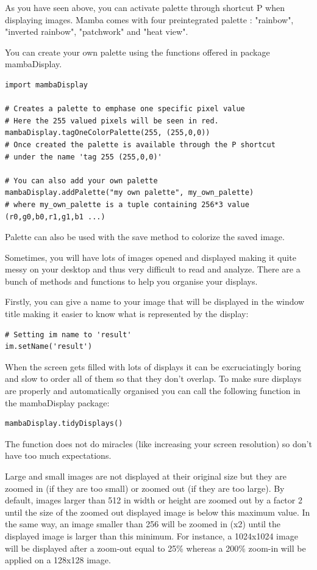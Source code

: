\documentclass[a4paper,10pt,oneside]{article}
\begin{document}
As you have seen above, you can activate palette through shortcut P when displaying
images. Mamba comes with four preintegrated palette : "rainbow", "inverted rainbow",
"patchwork" and "heat view".

You can create your own palette using the functions offered in package
mambaDisplay.

\lstset{language=Python}
\begin{lstlisting}
import mambaDisplay

# Creates a palette to emphase one specific pixel value
# Here the 255 valued pixels will be seen in red.
mambaDisplay.tagOneColorPalette(255, (255,0,0))
# Once created the palette is available through the P shortcut
# under the name 'tag 255 (255,0,0)'

# You can also add your own palette
mambaDisplay.addPalette("my own palette", my_own_palette)
# where my_own_palette is a tuple containing 256*3 value (r0,g0,b0,r1,g1,b1 ...)
\end{lstlisting}

Palette can also be used with the save method to colorize the saved image.

Sometimes, you will have lots of images opened and displayed making it quite
messy on your desktop and thus very difficult to read and analyze. There are a
bunch of methods and functions to help you organise your displays.

Firstly, you can give a name to your image that will be displayed in the window
title making it easier to know what is represented by the display:

\lstset{language=Python}
\begin{lstlisting}
# Setting im name to 'result'
im.setName('result')
\end{lstlisting}

When the screen gets filled with lots of displays it can be excruciatingly
boring and slow to order all of them so that they don't overlap. To make sure 
displays are properly and automatically organised you can call the following 
function in the mambaDisplay package:

\lstset{language=Python}
\begin{lstlisting}
mambaDisplay.tidyDisplays()
\end{lstlisting}

The function does not do miracles (like increasing your screen resolution) so
don't have too much expectations.

Large and small images are not displayed at their original size but they are
zoomed in (if they are too small) or zoomed out (if they are too large). By
default, images larger than 512 in width or height are zoomed out by a factor 2
until the size of the zoomed out displayed image is below this maximum value.
In the same way, an image smaller than 256 will be zoomed in (x2) until
the displayed image is larger than this minimum. For instance, a 1024x1024 image
will be displayed after a zoom-out equal to 25\% whereas a 200\% zoom-in will be
applied on a 128x128 image.
\end{document}
